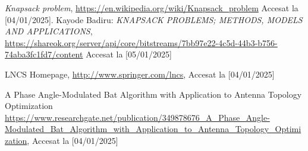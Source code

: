 \documentclass[runningheads]{llncs}
\begin{document}
%
%
%
% 
% 
%
\begin{thebibliography}{8}
\emph{Knapsack problem}, \url{https://en.wikipedia.org/wiki/Knapsack_problem} Accesat la [04/01/2025].
Kayode Badiru: \emph{KNAPSACK PROBLEMS; METHODS, MODELS AND APPLICATIONS},
\url{https://shareok.org/server/api/core/bitstreams/7bb97e22-4c5d-44b3-b756-74aba3fc1fd7/content} 
Accesat la [05/01/2025]

LNCS Homepage, \url{http://www.springer.com/lncs}, Accesat la [04/01/2025]

A Phase Angle-Modulated Bat Algorithm with Application to Antenna Topology Optimization
\url{https://www.researchgate.net/publication/349878676_A_Phase_Angle-Modulated_Bat_Algorithm_with_Application_to_Antenna_Topology_Optimization}, Accesat la [04/01/2025]

\end{thebibliography}
\end{document}
